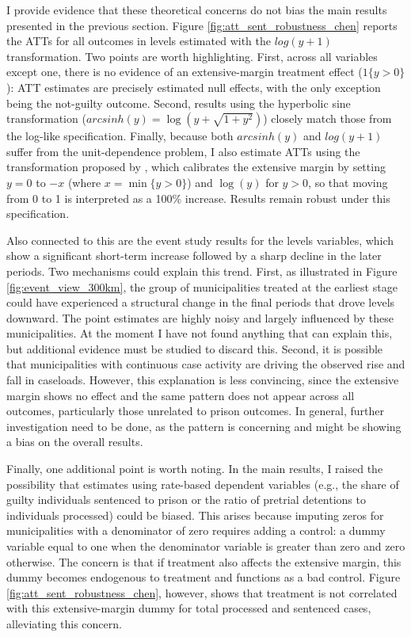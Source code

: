 I provide evidence that these theoretical concerns do not bias the main results presented in the previous section. Figure \ref{fig:att_sent_robustness_chen} reports the ATTs for all outcomes in levels estimated with the $log(y+1)$ transformation. Two points are worth highlighting. First, across all variables except one, there is no evidence of an extensive-margin treatment effect ($1\{y>0\}$): ATT estimates are precisely estimated null effects, with the only exception being the not-guilty outcome. Second, results using the hyperbolic sine transformation ($arcsinh(y) = \log(y + \sqrt{1 + y^2})$) closely match those from the log-like specification. Finally, because both $arcsinh(y)$ and $log(y+1)$ suffer from the unit-dependence problem, I also estimate ATTs using the transformation proposed by \cite{ChenRoth2024}, which calibrates the extensive margin by setting $y=0$ to $-x$ (where $x = \min\{y>0\}$) and $\log(y)$ for $y>0$, so that moving from 0 to 1 is interpreted as a 100\% increase. Results remain robust under this specification. 

Also connected to this are the event study results for the levels variables, which show a significant short-term increase followed by a sharp decline in the later periods. Two mechanisms could explain this trend. First, as illustrated in Figure \ref{fig:event_view_300km}, the group of municipalities treated at the earliest stage could have experienced a structural change in the final periods that drove levels downward. The point estimates are highly noisy and largely influenced by these municipalities. At the moment I have not found anything that can explain this, but additional evidence must be studied to discard this. Second, it is possible that municipalities with continuous case activity are driving the observed rise and fall in caseloads. However, this explanation is less convincing, since the extensive margin shows no effect and the same pattern does not appear across all outcomes, particularly those unrelated to prison outcomes. In general, further investigation need to be done, as the pattern is concerning and might be showing a bias on the overall results.

Finally, one additional point is worth noting. In the main results, I raised the possibility that estimates using rate-based dependent variables (e.g., the share of guilty individuals sentenced to prison or the ratio of pretrial detentions to individuals processed) could be biased. This arises because imputing zeros for municipalities with a denominator of zero requires adding a control: a dummy variable equal to one when the denominator variable is greater than zero and zero otherwise. The concern is that if treatment also affects the extensive margin, this dummy becomes endogenous to treatment and functions as a bad control. Figure \ref{fig:att_sent_robustness_chen}, however, shows that treatment is not correlated with this extensive-margin dummy for total processed and sentenced cases, alleviating this concern.

